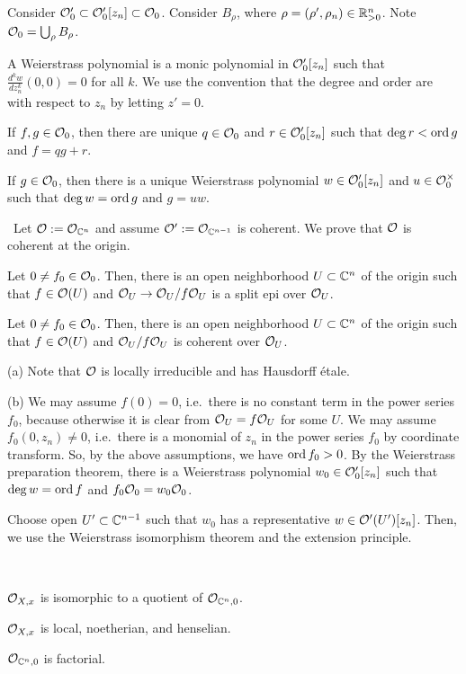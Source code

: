 \documentclass{../../large}
\begin{document}
\begin{prb}
Consider $\mathcal{O}'_0\subset\mathcal{O}'_0[z_n]\subset\mathcal{O}_0$.
Consider $B_\rho$, where $\rho=(\rho',\rho_n)\in\mathbb{R}_{>0}^n$.
Note $\mathcal{O}_0=\bigcup_\rho B_\rho$.

A Weierstrass polynomial is a monic polynomial in $\mathcal{O}'_0[z_n]$ such that $\frac{d^kw}{dz_n^k}(0,0)=0$ for all $k$.
We use the convention that the degree and order are with respect to $z_n$ by letting $z'=0$.
\begin{parts}
\item If $f,g\in\mathcal{O}_0$, then there are unique $q\in\mathcal{O}_0$ and $r\in\mathcal{O}'_0[z_n]$ such that $\deg r<\operatorname{ord} g$ and $f=qg+r$.
\item If $g\in\mathcal{O}_0$, then there is a unique Weierstrass polynomial $w\in\mathcal{O}'_0[z_n]$ and $u\in\mathcal{O}_0^\times$ such that $\deg w=\operatorname{ord} g$ and $g=uw$.
\end{parts}
\end{prb}

\begin{prb}
\end{prb}


\begin{prb}\,
Let $\mathcal{O}:=\mathcal{O}_{\mathbb{C}^n}$ and assume $\mathcal{O}':=\mathcal{O}_{\mathbb{C}^{n-1}}$ is coherent.
We prove that $\mathcal{O}$ is coherent at the origin.
\begin{parts}
\item Let $0\ne f_0\in\mathcal{O}_0$. Then, there is an open neighborhood $U\subset\mathbb{C}^n$ of the origin such that $f\in\mathcal{O}(U)$ and $\mathcal{O}_U\to\mathcal{O}_U/f\mathcal{O}_U$ is a split epi over $\mathcal{O}_U$.
\item Let $0\ne f_0\in\mathcal{O}_0$. Then, there is an open neighborhood $U\subset\mathbb{C}^n$ of the origin such that $f\in\mathcal{O}(U)$ and $\mathcal{O}_U/f\mathcal{O}_U$ is coherent over $\mathcal{O}_U$.
\end{parts}
\end{prb}
\begin{pf}
(a)
Note that $\mathcal{O}$ is locally irreducible and has Hausdorff \'etale.

(b)
We may assume $f(0)=0$, i.e.~there is no constant term in the power series $f_0$, because otherwise it is clear from $\mathcal{O}_U=f\mathcal{O}_U$ for some $U$.
We may assume $f_0(0,z_n)\ne0$, i.e.~there is a monomial of $z_n$ in the power series $f_0$ by coordinate transform.
So, by the above assumptions, we have $\operatorname{ord} f_0>0$.
By the Weierstrass preparation theorem, there is a Weierstrass polynomial $w_0\in\mathcal{O}'_0[z_n]$ such that $\deg w=\operatorname{ord} f$ and $f_0\mathcal{O}_0=w_0\mathcal{O}_0$.

Choose open $U'\subset\mathbb{C}^{n-1}$ such that $w_0$ has a representative $w\in\mathcal{O}'(U')[z_n]$.
Then, we use the Weierstrass isomorphism theorem and the extension principle.


\end{pf}


\begin{prb}\,
\begin{parts}
\item $\mathcal{O}_{X,x}$ is isomorphic to a quotient of $\mathcal{O}_{\mathbb{C}^n,0}$.
\item $\mathcal{O}_{X,x}$ is local, noetherian, and henselian.
\item $\mathcal{O}_{\mathbb{C}^n,0}$ is factorial.
\end{parts}
\end{prb}
\end{document}
